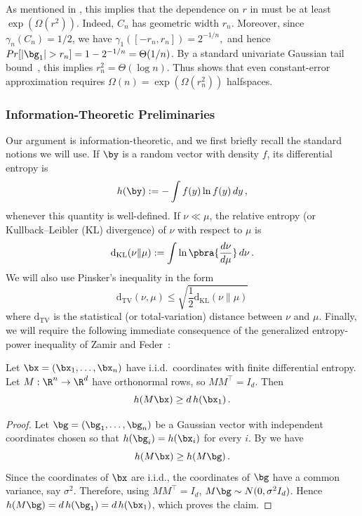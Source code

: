 \documentclass[11pt]{article}
\newcommand{\dtv}{\mathrm{d}_{\mathrm{TV}}}
\newcommand{\dkl}{\mathrm{d}_{\mathrm{KL}}}
\begin{document}
As mentioned in , this implies that the dependence on $r$ in  must be at least $\exp(\Omega(r^2))$.  
Indeed, $C_n$ has geometric width $r_n$. Moreover, since $\gamma_n(C_n)=1/2$, we have $\gamma_1([-r_n,r_n])=2^{-1/n},$
and hence $Pr[|\bg_1|>r_n]=1-2^{-1/n}=\Theta(1/n)$.
By a standard univariate Gaussian tail bound~\cite[Proposition~2.1.2]{vershynin2018high}, this implies $r_n^2=\Theta(\log n)$.  
Thus  shows that even constant-error approximation requires $\Omega(n)=\exp(\Omega(r_n^2))$ halfspaces.

\subsubsection{Information-Theoretic Preliminaries}
\label{subsubsec:cube-lb-info-theory}

Our argument is information-theoretic, and we first briefly recall the standard notions we will use. 
If $\by$ is a random vector with density $f$, its differential entropy is
\[
	h(\by):=-\int f(y)\ln f(y)\,dy\,,
\]
whenever this quantity is well-defined.  
If $\nu\ll\mu$, the relative entropy (or Kullback--Leibler (KL) divergence) of $\nu$ with respect to $\mu$ is 
\[
	\dkl(\nu\|\mu):=\int \ln\pbra{\frac{d\nu}{d\mu}}\,d\nu\,.
\]
We will also use Pinsker's inequality in the form
\[
	\dtv(\nu,\mu)\leq \sqrt{\frac{1}{2} \dkl(\nu\|\mu)}
\]
where $\dtv$ is the statistical (or total-variation) distance between $\nu$ and $\mu$. 
Finally, we will require the following immediate consequence of the generalized entropy-power inequality of Zamir and Feder~\cite{ZamirFeder93}:

\begin{lemma}
\label{lem:zamir-feder-projection-entropy}
	Let $\bx=(\bx_1,\ldots,\bx_n)$ have i.i.d.~coordinates with finite
	differential entropy.  
	Let $M:\R^n\to\R^d$ have orthonormal rows, so
	$MM^\top =I_d$.  
	Then
	\[
		h(M\bx)\geq d\,h(\bx_1)\,.
	\]
\end{lemma}

\begin{proof}
	Let $\bg=(\bg_1,\ldots,\bg_n)$ be a Gaussian vector with independent
	coordinates chosen so that $h(\bg_i)=h(\bx_i)$ for every $i$. 
	By \cite[Theorem~1]{ZamirFeder93} we have 
	\[
		h(M\bx)\geq h(M\bg)\,.
	\]
	Since the coordinates of $\bx$ are i.i.d., the coordinates of $\bg$ have a
	common variance, say $\sigma^2$.  Therefore, using $MM^\top =I_d$, $M\bg\sim N(0,\sigma^2 I_d)$. 
	Hence $h(M\bg)=d\,h(\bg_1)=d\,h(\bx_1)$, which proves the claim.
\end{proof}
\end{document}
